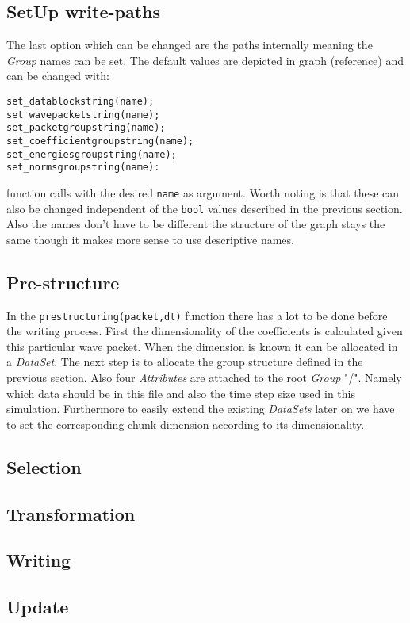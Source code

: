 \documentclass{article}
\begin{document}
\subsection{SetUp write-paths}
The last option which can be changed are the paths internally meaning the \textit{Group} names can be set. The default values are depicted in graph (reference) and can be changed with:
\begin{lstlisting}
set_datablockstring(name);
set_wavepacketstring(name);
set_packetgroupstring(name);
set_coefficientgroupstring(name);
set_energiesgroupstring(name);
set_normsgroupstring(name):
\end{lstlisting}
function calls with the desired \texttt{name} as argument. Worth noting is that these can also be changed independent of the \texttt{bool} values described in the previous section. Also the names don't have to be different the structure of the graph stays the same though it makes more sense to use descriptive names.

\subsection{Pre-structure}
In the \texttt{prestructuring(packet,dt)} function there has a lot to be done before the writing process. First the dimensionality of the coefficients is calculated given this particular wave packet. When the dimension is known it can be allocated in a \textit{DataSet}. The next step is to allocate the group structure defined in the previous section. Also four \textit{Attributes} are attached to the root \textit{Group} "/". Namely which data should be in this file and also the time step size used in this simulation. Furthermore to easily extend the existing \textit{DataSets} later on we have to set the corresponding chunk-dimension according to its dimensionality. 






\subsection{Selection}
\subsection{Transformation}
\subsection{Writing}
\subsection{Update}
\end{document}
